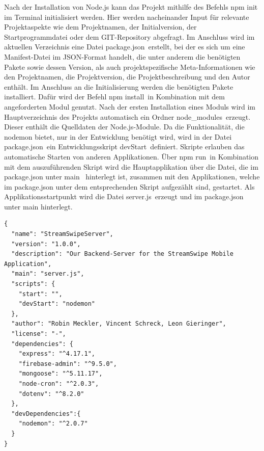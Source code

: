 \noindent
Nach der Installation von Node.js kann das Projekt mithilfe des Befehls \glqq npm init\grqq \, im Terminal initialisiert werden. 
Hier werden nacheinander Input für relevante Projektaspekte wie dem Projektnamen, der Initialversion, der Startprogrammdatei oder dem GIT-Repository abgefragt.  
Im Anschluss wird im aktuellen Verzeichnis eine Datei \glqq package.json\grqq \, erstellt,  bei der es sich um eine Manifest-Datei im JSON-Format handelt, die unter anderem die benötigten Pakete sowie dessen Version, als auch projektspezifische Meta-Informationen wie den Projektnamen, die Projektversion, die Projektbeschreibung und den Autor enthält.
\newline
Im Anschluss an die Initialisierung werden die benötigten Pakete installiert. Dafür wird der Befehl \glqq npm install\grqq \, in Kombination mit dem angeforderten Modul genutzt. 
Nach der ersten Installation eines Moduls wird im Hauptverzeichnis des Projekts automatisch ein Ordner \glqq node\_modules\grqq \, erzeugt. Dieser enthält die Quelldaten der Node.js-Module. 
\newline
Da die Funktionalität, die nodemon bietet, nur in der Entwicklung benötigt wird, wird in der Datei \glqq package.json\grqq \, ein Entwicklungsskript \glqq devStart\grqq \, definiert. 
Skripte erlauben das automatische Starten von anderen Applikationen. Über \glqq npm run\grqq \, in Kombination mit dem auszuführenden Skript wird die Hauptapplikation über die Datei, die im package.json unter \glqq main \grqq \, hinterlegt ist, zusammen mit den Applikationen, welche im package.json unter dem entsprechenden Skript aufgezählt sind, gestartet.
\newline
Als Applikationsstartpunkt wird die Datei \glqq server.js\grqq \, erzeugt und im package.json unter main hinterlegt.\\

\begin{lstlisting}[caption=Datei package.json, label=lst:packagejson]
{
  "name": "StreamSwipeServer",
  "version": "1.0.0",
  "description": "Our Backend-Server for the StreamSwipe Mobile Application",
  "main": "server.js",
  "scripts": {
    "start": "",
    "devStart": "nodemon"
  },
  "author": "Robin Meckler, Vincent Schreck, Leon Gieringer",
  "license": "-",
  "dependencies": {
    "express": "^4.17.1",
    "firebase-admin": "^9.5.0",
    "mongoose": "^5.11.17",
    "node-cron": "^2.0.3",
    "dotenv": "^8.2.0"
  },
  "devDependencies":{
    "nodemon": "^2.0.7"
  }
}
\end{lstlisting}

